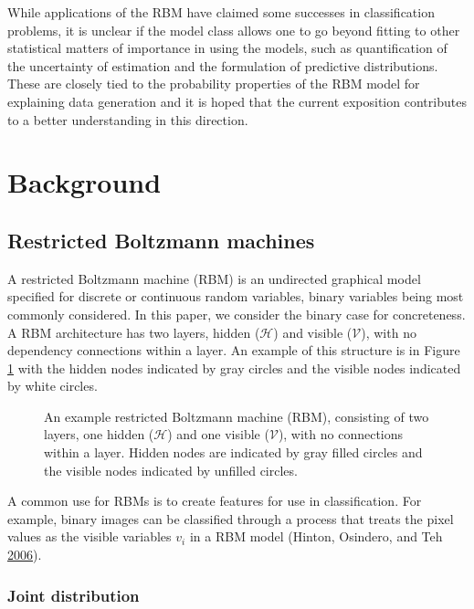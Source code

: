 \documentclass[12pt]{article}
\theoremstyle{definition}
\begin{document}
While applications of the RBM have claimed some successes in
classification problems, it is unclear if the model class allows one to
go beyond fitting to other statistical matters of importance in using
the models, such as quantification of the uncertainty of estimation and
the formulation of predictive distributions. These are closely tied to
the probability properties of the RBM model for explaining data
generation and it is hoped that the current exposition contributes to a
better understanding in this direction.

\section{Background}\label{background}

\subsection{Restricted Boltzmann
machines}\label{restricted-boltzmann-machines}

A restricted Boltzmann machine (RBM) is an undirected graphical model
specified for discrete or continuous random variables, binary variables
being most commonly considered. In this paper, we consider the binary
case for concreteness. A RBM architecture has two layers, hidden
(\(\mathcal{H}\)) and visible (\(\mathcal{V}\)), with no dependency
connections within a layer. An example of this structure is in Figure
\ref{fig:rbm} with the hidden nodes indicated by gray circles and the
visible nodes indicated by white circles.
\begin{figure}
  \centering
  \resizebox{\linewidth}{!}{}
  \caption{An example restricted Boltzmann machine (RBM), consisting of two layers, one hidden ($\mathcal{H}$) and one visible ($\mathcal{V}$), with no connections within a layer. Hidden nodes are indicated by gray filled circles and the visible nodes indicated by unfilled circles.}
  \label{fig:rbm}
\end{figure}
A common use for RBMs is to create features for use in classification.
For example, binary images can be classified through a process that
treats the pixel values as the visible variables \(v_i\) in a RBM model
(Hinton, Osindero, and Teh
\protect\hyperlink{ref-hinton2006fast}{2006}).

\subsubsection{Joint distribution}\label{joint-distribution}
\end{document}
